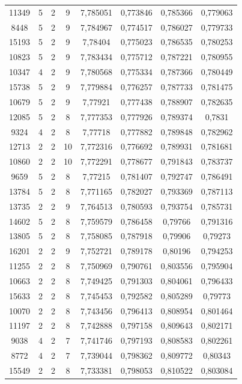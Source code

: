 \begin{longtable}{|c|c|c|c|c|c|c|c|}
11349 & 5 & 2 & 9 & 7,785051 & 0,773846 & 0,785366 & 0,779063 \\
8448 & 5 & 2 & 9 & 7,784967 & 0,774517 & 0,786027 & 0,779733 \\
15193 & 5 & 2 & 9 & 7,78404 & 0,775023 & 0,786535 & 0,780253 \\
10823 & 5 & 2 & 9 & 7,783434 & 0,775712 & 0,787221 & 0,780955 \\
10347 & 4 & 2 & 9 & 7,780568 & 0,775334 & 0,787366 & 0,780449 \\
15738 & 5 & 2 & 9 & 7,779884 & 0,776257 & 0,787733 & 0,781475 \\
10679 & 5 & 2 & 9 & 7,77921 & 0,777438 & 0,788907 & 0,782635 \\
12085 & 5 & 2 & 8 & 7,777353 & 0,777926 & 0,789374 & 0,7831 \\
9324 & 4 & 2 & 8 & 7,77718 & 0,777882 & 0,789848 & 0,782962 \\
12713 & 2 & 2 & 10 & 7,772316 & 0,776692 & 0,789931 & 0,781681 \\
10860 & 2 & 2 & 10 & 7,772291 & 0,778677 & 0,791843 & 0,783737 \\
9659 & 5 & 2 & 8 & 7,77215 & 0,781407 & 0,792747 & 0,786491 \\
13784 & 5 & 2 & 8 & 7,771165 & 0,782027 & 0,793369 & 0,787113 \\
13735 & 2 & 2 & 9 & 7,764513 & 0,780593 & 0,793754 & 0,785731 \\
14602 & 5 & 2 & 8 & 7,759579 & 0,786458 & 0,79766 & 0,791316 \\
13805 & 5 & 2 & 8 & 7,758085 & 0,787918 & 0,79906 & 0,79273 \\
16201 & 2 & 2 & 9 & 7,752721 & 0,789178 & 0,80196 & 0,794253 \\
11255 & 2 & 2 & 8 & 7,750969 & 0,790761 & 0,803556 & 0,795904 \\
10663 & 2 & 2 & 8 & 7,749425 & 0,791303 & 0,804061 & 0,796433 \\
15633 & 2 & 2 & 8 & 7,745453 & 0,792582 & 0,805289 & 0,79773 \\
10070 & 2 & 2 & 8 & 7,743456 & 0,796413 & 0,808954 & 0,801464 \\
11197 & 2 & 2 & 8 & 7,742888 & 0,797158 & 0,809643 & 0,802171 \\
9038 & 4 & 2 & 7 & 7,741746 & 0,797193 & 0,808583 & 0,802261 \\
8772 & 4 & 2 & 7 & 7,739044 & 0,798362 & 0,809772 & 0,80343 \\
15549 & 2 & 2 & 8 & 7,733381 & 0,798053 & 0,810522 & 0,803084 \\

\end{longtable}

